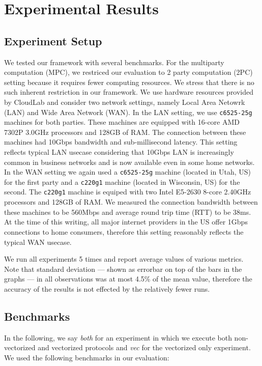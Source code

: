 \section{Experimental Results}
\label{sec:results}

\subsection{Experiment Setup}\label{sec:experiment_setup}
We tested our framework with several benchmarks. For the multiparty computation (MPC), we restriced our evaluation to 2 party computation (2PC) setting because it requires fewer computing resources. We stress that there is no such inherent restriction in our framework. We use hardware resources provided by CloudLab\cite{DuplyakinATC19} and consider two network settings, namely Local Area Netowrk (LAN) and Wide Area Network (WAN). In the LAN setting, we use {\tt c6525-25g} machines for both parties. These machines are equipped with 16-core AMD 7302P 3.0GHz processors and 128GB of RAM. The connection between these machines had 10Gbps bandwidth and sub-millisecond latency. This setting reflects typical LAN usecase considering that 10Gbps LAN is increasingly common in business networks and is now available even in some home networks. In the WAN setting we again used a {\tt c6525-25g} machine (located in Utah, US) for the first party and a {\tt c220g1} machine (located in Wisconsin, US) for the second. The {\tt c220g1} machine is equiped with two Intel E5-2630 8-core 2.40GHz processors and 128GB of RAM. We measured the connection bandwidth between these machines to be 560Mbps and average round trip time (RTT) to be 38ms. At the time of this writing, all major internet providers in the US offer 1Gbps connections to home consumers, therefore this setting reasonably reflects the typical WAN usecase.

We run all experiments 5 times and report average values of various metrics. Note that standard deviation --- shown as errorbar on top of the bars in the graphs --- in all observations was at most 4.5\% of the mean value, therefore the accuracy of the results is not effected by the relatively fewer runs.

\subsection{Benchmarks}\label{sec:benchmarks_description}
In the following, we say {\em both} for an experiment in which we execute both non-vectorized and vectorized protocols and {\em vec} for the vectorized only experiment. We used the following benchmarks in our evaluation:


